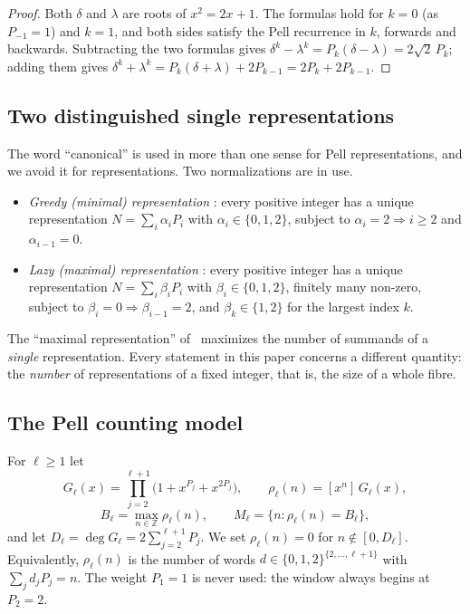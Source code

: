 \documentclass[11pt]{amsart}
\theoremstyle{definition}
\theoremstyle{remark}
\theoremstyle{plain}
\numberwithin{equation}{section}
\newcommand{\Z}{\mathbb{Z}}
\begin{document}
\begin{proof}
Both $\delta$ and $\lambda$ are roots of $x^2=2x+1$. The formulas hold for $k=0$ (as $P_{-1}=1$) and
$k=1$, and both sides satisfy the Pell recurrence in $k$, forwards and backwards. Subtracting the two
formulas gives $\delta^k-\lambda^k=P_k(\delta-\lambda)=2\sqrt2\,P_k$; adding them gives
$\delta^k+\lambda^k=P_k(\delta+\lambda)+2P_{k-1}=2P_k+2P_{k-1}$.
\end{proof}

\subsection{Two distinguished single representations}\label{sec:terminology}
The word ``canonical'' is used in more than one sense for Pell representations, and we avoid it for
representations. Two normalizations are in use.
\begin{itemize}[leftmargin=1.6em]
\item \emph{Greedy (minimal) representation} \cite{KnopfmacherRobbins2004,Horadam1996}: every positive
integer has a unique representation $N=\sum_i\alpha_iP_i$ with $\alpha_i\in\{0,1,2\}$, subject to
$\alpha_i=2\Rightarrow i\ge2$ and $\alpha_{i-1}=0$.
\item \emph{Lazy (maximal) representation} \cite{Horadam1994,Horadam1996}: every positive integer has
a unique representation $N=\sum_i\beta_iP_i$ with $\beta_i\in\{0,1,2\}$, finitely many non-zero,
subject to $\beta_i=0\Rightarrow\beta_{i-1}=2$, and $\beta_k\in\{1,2\}$ for the largest index $k$.
\end{itemize}
The ``maximal representation'' of~\cite{Horadam1994} maximizes the number of summands of a
\emph{single} representation. Every statement in this paper concerns a different quantity: the
\emph{number} of representations of a fixed integer, that is, the size of a whole fibre.

\subsection{The Pell counting model}
For $\ell\ge1$ let
\begin{equation}\label{eq:model}
G_\ell(x)=\prod_{j=2}^{\ell+1}\bigl(1+x^{P_j}+x^{2P_j}\bigr),\qquad
\rho_\ell(n)=[x^n]\,G_\ell(x),
\end{equation}
\[
B_\ell=\max_{n\in\Z}\rho_\ell(n),\qquad M_\ell=\{n:\rho_\ell(n)=B_\ell\},
\]
and let $D_\ell=\deg G_\ell=2\sum_{j=2}^{\ell+1}P_j$. We set $\rho_\ell(n)=0$ for $n\notin[0,D_\ell]$.
Equivalently, $\rho_\ell(n)$ is the number of words $d\in\{0,1,2\}^{\{2,\dots,\ell+1\}}$ with
$\sum_jd_jP_j=n$. The weight $P_1=1$ is never used: the window always begins at $P_2=2$.
\end{document}

